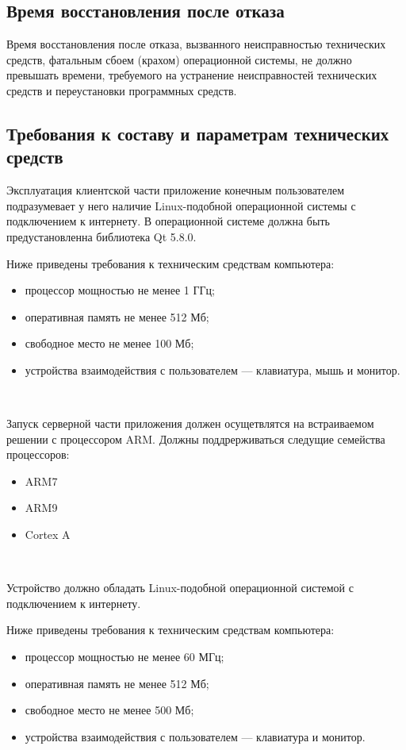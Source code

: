 \documentclass[a4paper,english]{G2-105}
\begin{document}
\subsection{Время восстановления после отказа}
\par Время восстановления после отказа, вызванного неисправностью технических средств, фатальным сбоем (крахом) операционной системы, не должно превышать времени, требуемого на устранение неисправностей технических средств и переустановки программных средств.

\subsection{Требования к составу и параметрам технических средств}
Эксплуатация клиентской части приложение конечным пользователем подразумевает у него наличие Linux-подобной операционной системы с подключением к интернету. В операционной системе должна быть предустановленна библиотека Qt 5.8.0.
\par Ниже приведены требования к техническим средствам компьютера:
\begin{itemize}
\item процессор мощностью не менее 1 ГГц;
\item оперативная память не менее 512 Мб;
\item свободное место не менее 100 Мб;
\item устройства взаимодействия с пользователем — клавиатура, мышь и
монитор.
\end{itemize}
~\ 
\par Запуск серверной части приложения должен осущетвлятся на встраиваемом решении с процессором ARM. Должны поддрерживаться следущие семейства процессоров:
\begin{itemize}
\item ARM7
\item ARM9
\item Cortex A
\end{itemize}
~\ 
\par Устройство должно обладать Linux-подобной операционной системой с подключением к интернету.
\par Ниже приведены требования к техническим средствам компьютера:
\begin{itemize}
\item процессор мощностью не менее 60 МГц;
\item оперативная память не менее 512 Мб;
\item свободное место не менее 500 Мб;
\item устройства взаимодействия с пользователем — клавиатура и монитор.
\end{itemize}
\end{document}
